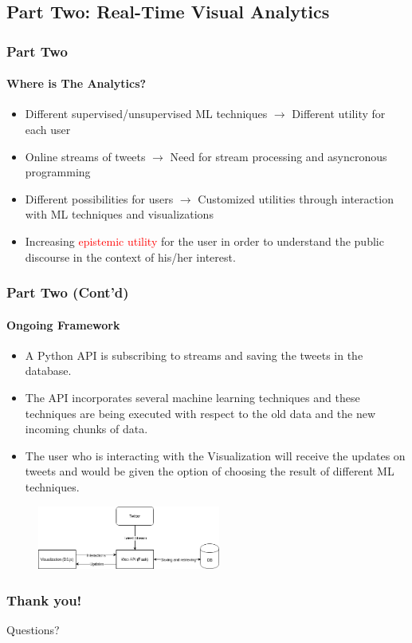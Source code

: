 \documentclass[11pt]{beamer}
\begin{document}
\subsection{Part Two: Real-Time Visual Analytics}
\begin{frame}
\frametitle{Part Two}
\framesubtitle{Where is The Analytics?}
	\begin{itemize}
		\item<1-> Different supervised/unsupervised ML techniques $\rightarrow$ Different utility for each user
		\item<2-> Online streams of tweets $\rightarrow$ Need for stream processing and asyncronous programming
		\item<3-> Different possibilities for users $\rightarrow$ Customized utilities through interaction with ML techniques and visualizations
		\item<4-> Increasing \textcolor{red}{epistemic utility} for the user in order to understand the public discourse in the context of his/her interest.
	\end{itemize}
\end{frame}

\begin{frame}
\frametitle{Part Two (Cont'd)}
\framesubtitle{Ongoing Framework}
\begin{itemize}
	\item A Python API is subscribing to streams and saving the tweets in the database.
	\item The API incorporates several machine learning techniques and these techniques are being executed with respect to the old data and the new incoming chunks of data.
	\item The user who is interacting with the Visualization will receive the updates on tweets and would be given the option of choosing the result of different ML techniques.
\end{itemize}
\begin{figure}
	\centering\includegraphics[width=6cm]{resources/UWORCS2019.png}
\end{figure}
\end{frame}

\begin{frame}
\frametitle{Thank you!}
	Questions?
\end{frame}
\end{document}
